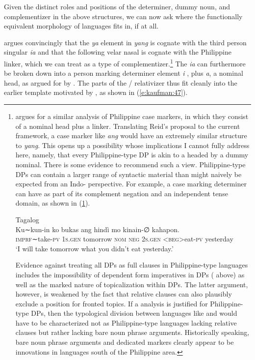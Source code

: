 \documentclass[output=paper]{langsci/langscibook}
\begin{document}
\noindent
Given the distinct roles and positions of the determiner, dummy noun,   and complementizer in the above  structures, we can now ask where the functionally equivalent morphology of  languages fits in, if at all. 


\citet{Adelaar:1992} argues convincingly that the \textit{ya} element in \textit{yang} is cognate with the third person singular  \textit{ia} and that the following velar nasal is cognate with the Philippine linker, which we can treat as a type of complementizer.\footnote{\citet{Reid:2002a} argues for a similar analysis of Philippine case markers, in which they consist of a nominal head plus a linker. Translating Reid's proposal to the current framework, a case marker like  \textit{ang} would have an extremely similar structure to  \textit{yang}. This opens up a possibility whose implications I cannot fully address here, namely, that every Philippine-type DP is akin to a  headed by a dummy nominal. There is some evidence to recommend such a view. Philippine-type DPs can contain a larger range of syntactic material than might naively be expected from an Indo- perspective. For example, a case marking determiner can have as part of its complement negation and an independent tense domain, as shown in (\ref{e:kaufman:46.5}).

\noindent\parbox[t]{\linewidth}{\begin{exe}
	\ex\label{e:kaufman:46.5}{Tagalog}\\
	\gll Ku∼kun-in ko bukas ang hindì mo k{\USSmaller}in{\USGreater}ain-∅ kahapon.\\
	\textsc{imprf}∼take-\textsc{pv} \textsc{1s.gen} tomorrow \textsc{nom} \textsc{neg} \textsc{2s.gen} <\textsc{beg}>eat-\textsc{pv} yesterday\\
	\glt `I will take tomorrow what you didn't eat yesterday.'
\end{exe}}

Evidence against treating all DPs as full clauses in Philippine-type languages includes the impossibility of dependent form imperatives in DPs ( above) as well as the marked nature of topicalization within DPs. The latter argument, however, is weakened by the fact that relative clauses can also plausibly exclude a position for fronted topics. If a  analysis is justified for Philippine-type DPs, then the typological division between languages like  and  would have to be characterized not as Philippine-type languages lacking relative clauses but rather lacking bare noun phrase arguments. Historically speaking, bare noun phrase arguments and dedicated  markers clearly appear to be innovations in languages south of the Philippine area.}
The  \textit{ia} can furthermore be broken down into a person marking determiner element \textit{i} \citep{Ross:2006}, plus \textit{a}, a nominal head, as argued for by \citet{Reid:2002a}. The parts of the / relativizer thus fit cleanly into the earlier template motivated by , as shown in (\ref{e:kaufman:47}). 
\end{document}
